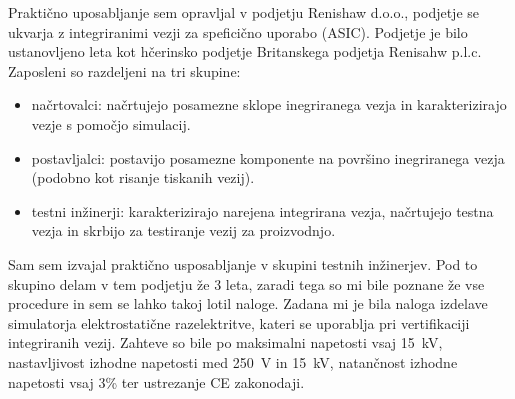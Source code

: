 \documentclass[a4paper,twoside,openright,12pt,slovene]{book}
\begin{document}
Praktično uposabljanje sem opravljal v podjetju Renishaw d.o.o., podjetje se ukvarja z integriranimi vezji za speficično uporabo (ASIC). Podjetje je bilo ustanovljeno leta kot hčerinsko podjetje Britanskega podjetja Renisahw p.l.c. Zaposleni so razdeljeni na tri skupine:
\begin{itemize}
	\item načrtovalci: načrtujejo posamezne sklope inegriranega vezja in karakterizirajo vezje s pomočjo simulacij.
	\item postavljalci: postavijo posamezne komponente na površino inegriranega vezja (podobno kot risanje tiskanih vezij).
	\item testni inžinerji: karakterizirajo narejena integrirana vezja, načrtujejo testna vezja in skrbijo za testiranje vezij za proizvodnjo.
\end{itemize}
Sam sem izvajal praktično usposabljanje v skupini testnih inžinerjev. Pod to skupino delam v tem podjetju že 3 leta, zaradi tega so mi bile poznane že vse procedure in sem se lahko takoj lotil naloge. Zadana mi je bila naloga izdelave simulatorja elektrostatične razelektritve, kateri se uporablja pri vertifikaciji integriranih vezij. Zahteve so bile po maksimalni napetosti vsaj \SI{15}{\kilo\volt}, nastavljivost izhodne napetosti med \SI{250}{\volt} in \SI{15}{\kilo\volt}, natančnost izhodne napetosti vsaj 3\% ter ustrezanje CE zakonodaji. 
\end{document}
